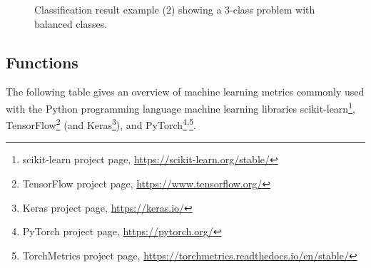 \documentclass{article}
\begin{document}
\begin{figure}[H]
{}

	\caption{Classification result example (2) showing a 3-class problem with balanced classes.}
	\label{figure:ML_example2}
\end{figure}




\clearpage




\subsection{Functions}

The following table gives an overview of machine learning metrics commonly used with the Python programming language machine learning libraries scikit-learn\footnote{scikit-learn project page, \url{https://scikit-learn.org/stable/}}, TensorFlow\footnote{TensorFlow project page, \url{https://www.tensorflow.org/}} (and Keras\footnote{Keras project page, \url{https://keras.io/}}), and PyTorch\footnote{PyTorch project page, \url{https://pytorch.org/}}\textsuperscript{,}\footnote{TorchMetrics project page, \url{https://torchmetrics.readthedocs.io/en/stable/}}.
\end{document}
